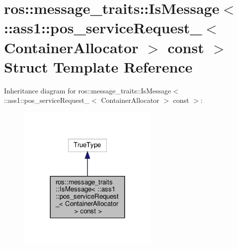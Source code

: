 \hypertarget{structros_1_1message__traits_1_1IsMessage_3_01_1_1ass1_1_1pos__serviceRequest___3_01ContainerAllocator_01_4_01const_01_4}{}\section{ros\+:\+:message\+\_\+traits\+:\+:Is\+Message$<$ \+:\+:ass1\+:\+:pos\+\_\+service\+Request\+\_\+$<$ Container\+Allocator $>$ const $>$ Struct Template Reference}
\label{structros_1_1message__traits_1_1IsMessage_3_01_1_1ass1_1_1pos__serviceRequest___3_01ContainerAllocator_01_4_01const_01_4}


Inheritance diagram for ros\+:\+:message\+\_\+traits\+:\+:Is\+Message$<$ \+:\+:ass1\+:\+:pos\+\_\+service\+Request\+\_\+$<$ Container\+Allocator $>$ const $>$\+:
\nopagebreak
\begin{figure}[H]
\begin{center}
\leavevmode
\includegraphics[width=192pt]{structros_1_1message__traits_1_1IsMessage_3_01_1_1ass1_1_1pos__serviceRequest___3_01ContainerAlld45e31205adf4c6e982fef7880ebe353}
\end{center}
\end{figure}


